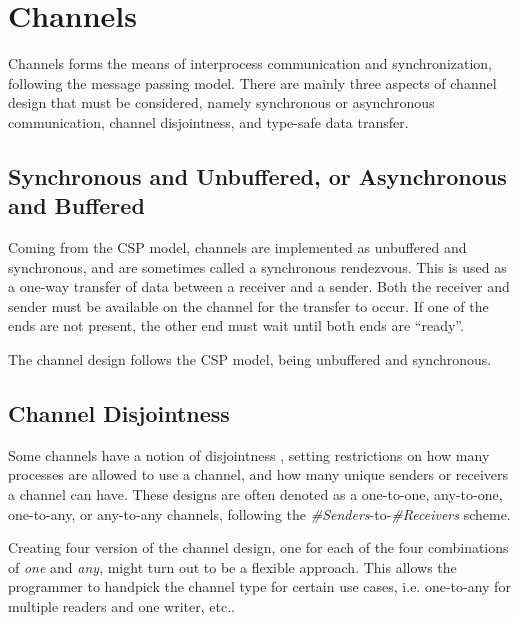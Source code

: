 \section{Channels}
\label{sec:channels}

Channels forms the means of interprocess communication and synchronization, following the message passing model. There are mainly three aspects of channel design that must be considered, namely synchronous or asynchronous communication, channel disjointness, and type\hyp{}safe data transfer. 


\subsection{Synchronous and Unbuffered, or Asynchronous and Buffered}

Coming from the CSP model, channels are implemented as unbuffered and synchronous, and are sometimes called a synchronous rendezvous. This is used as a one\hyp{}way transfer of data between a receiver and a sender. Both the receiver and sender must be available on the channel for the transfer to occur. If one of the ends are not present, the other end must wait until both ends are ``ready''.

The channel design follows the CSP model, being unbuffered and synchronous.


\subsection{Channel Disjointness}

Some channels have a notion of disjointness \citep[see][chapter 3.3.1]{xc}, setting restrictions on how many processes are allowed to use a channel, and how many unique senders or receivers a channel can have. These designs are often denoted as a one\hyp{}to\hyp{}one, any\hyp{}to\hyp{}one, one\hyp{}to\hyp{}any, or any\hyp{}to\hyp{}any channels, following the \textit{\#Senders}\hyp{}to\hyp{}\textit{\#Receivers} scheme.

Creating four version of the channel design, one for each of the four combinations of \textit{one} and \textit{any}, might turn out to be a flexible approach. This allows the programmer to handpick the channel type for certain use cases, i.e.  one\hyp{}to\hyp{}any for multiple readers and one writer, etc.. 

